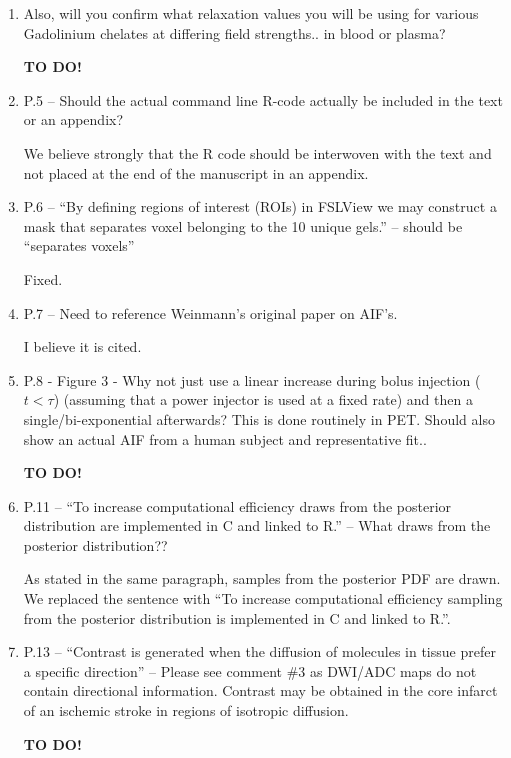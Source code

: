 \documentclass[11pt]{article}
\begin{document}
\begin{enumerate}
\item Also, will you confirm what relaxation values you will be using
  for various Gadolinium chelates at differing field strengths.. in
  blood or plasma?

  \textbf{TO DO!}

\item P.5 – Should the actual command line R-code actually be included
  in the text or an appendix?

  We believe strongly that the \textsf{R} code should be interwoven
  with the text and not placed at the end of the manuscript in an
  appendix.

\item P.6 – ``By defining regions of interest (ROIs) in FSLView we may
  construct a mask that separates voxel belonging to the 10 unique
  gels.'' – should be ``separates voxels''

  Fixed.

\item P.7 – Need to reference Weinmann’s original paper on AIF's.

  I believe it is cited.

\item P.8 - Figure 3 - Why not just use a linear increase during bolus
  injection ($t<\tau$) (assuming that a power injector is used at a
  fixed rate) and then a single/bi-exponential afterwards?  This is
  done routinely in PET.  Should also show an actual AIF from a human
  subject and representative fit..

  \textbf{TO DO!}  

\item P.11 – ``To increase computational efficiency draws from the
  posterior distribution are implemented in C and linked to R.'' –
  What draws from the posterior distribution??

  As stated in the same paragraph, samples from the posterior PDF are
  drawn.  We replaced the sentence with ``To increase computational
  efficiency sampling from the posterior distribution is implemented
  in \textsf{C} and linked to \textsf{R}.''.

\item P.13 – ``Contrast is generated when the diffusion of molecules
  in tissue prefer a specific direction'' – Please see comment \#3 as
  DWI/ADC maps do not contain directional information.  Contrast may
  be obtained in the core infarct of an ischemic stroke in regions of
  isotropic diffusion.

  \textbf{TO DO!}  


\end{enumerate}
\end{document}
